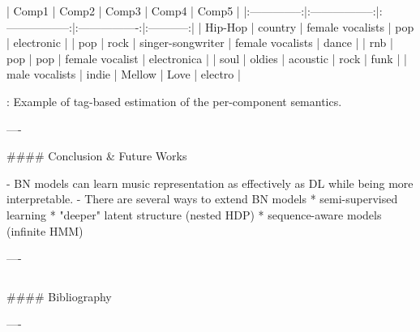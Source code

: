 \documentclass{beamer}
\begin{document}
\begin{frame}[fragile]
\begin{columns}[T]
\begin{column}{.46\textwidth}
\begin{markdown}
|  Comp1         |  Comp2            |  Comp3            |  Comp4           | Comp5       |
|:--------------:|:-----------------:|:-----------------:|:----------------:|:-----------:|
| Hip-Hop        | country           | female vocalists  | pop              | electronic  |
| pop            | rock              | singer-songwriter | female vocalists | dance       |
| rnb            | pop               | pop               | female vocalist  | electronica |
| soul           | oldies            | acoustic          | rock             | funk        |
| male vocalists | indie             | Mellow            | Love             | electro     |

  : Example of tag-based estimation of the per-component semantics.

----

#### Conclusion \& Future Works

- BN models can learn music representation as effectively as DL while being more interpretable.
- There are several ways to extend BN models
    * semi-supervised learning
    * "deeper" latent structure (nested HDP)
    * sequence-aware models (infinite HMM)

----


\end{markdown}
\end{column}
\end{columns}

\begin{markdown}

#### Bibliography




----

\end{markdown}

\end{frame}
\end{document}
